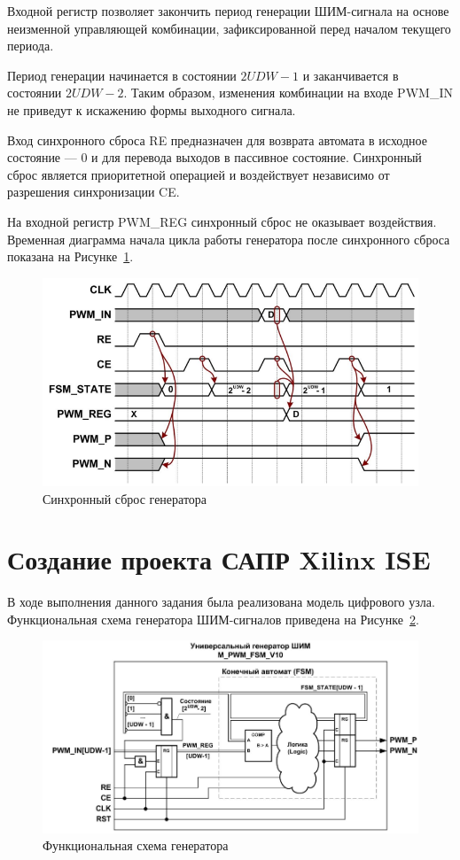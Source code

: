 Входной регистр позволяет закончить период генерации ШИМ-сигнала на
основе неизменной управляющей комбинации, зафиксированной перед
началом текущего периода. 

Период генерации начинается в состоянии $2UDW - 1$ и заканчивается в состоянии $2UDW - 2$. Таким образом, изменения
комбинации на входе PWM\_IN не приведут к искажению формы выходного
сигнала.

Вход синхронного сброса RE предназначен для возврата автомата в
исходное состояние --- 0 и для перевода выходов в пассивное состояние.
Синхронный сброс является приоритетной операцией и воздействует
независимо от разрешения синхронизации CE. 

На входной регистр
PWM\_REG синхронный сброс не оказывает воздействия.
Временная диаграмма начала цикла работы генератора после синхронного
сброса показана на Рисунке~\ref{fig:sync-rst}. 

\begin{figure}[h!]
	\centering
	\includegraphics[width=0.54\linewidth]{course-plis/images/lab4/sync-rst}
	\caption{Синхронный сброс генератора}
	\label{fig:sync-rst}
\end{figure}




\section{Создание проекта САПР Xilinx ISE}
В ходе выполнения данного задания была реализована модель цифрового узла. Функциональная схема генератора ШИМ-сигналов приведена на Рисунке~\ref{fig:func-scheme}.

\begin{figure}[h!]
	\centering
	\includegraphics[width=0.65\linewidth]{course-plis/images/lab4/func-scheme}
	\caption{Функциональная схема генератора}
	\label{fig:func-scheme}
\end{figure}

